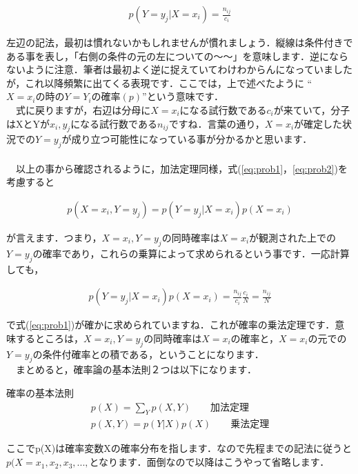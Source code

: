 \documentclass[11pt,a4paper]{ujreport} 	%
\begin{document}
\begin{align}
\label{eq:conditional}
p(Y=y_j | X=x_i) = \frac{n_{ij}}{c_i}
\end{align}

左辺の記法，最初は慣れないかもしれませんが慣れましょう．縦線は条件付きである事を表し，「右側の条件の元の左についての～～」を意味します．逆にならないように注意．筆者は最初よく逆に捉えていてわけわからんになっていましたが，これ以降頻繁に出てくる表現です．ここでは，上で述べたように ``$X=x_iの時のY=Y_iの確率(p)$''という意味です．\\
　式に戻りますが，右辺は分母に$X=x_i$になる試行数である$c_i$が来ていて，分子はXとYが$x_i, y_j$になる試行数である$n_{ij}$ですね．言葉の通り，$X=x_i$が確定した状況での$Y=y_j$が成り立つ可能性になっている事が分かるかと思います．\\
\\
　以上の事から確認されるように，加法定理同様，式(\ref{eq:prob1}，\ref{eq:prob2})を考慮すると

\begin{align}
p(X=x_i , Y=y_j) = p(Y=y_j | X=x_i)p(X=x_i)
\label{eq:product1}
\end{align}

が言えます．つまり，$X=x_i , Y=y_j$の同時確率は$X=x_i$が観測された上での$Y=y_j$の確率であり，これらの乗算によって求められるという事です．一応計算しても，

\begin{align}
p(Y=y_j | X=x_i)p(X=x_i) = \frac{n_{ij}}{c_i}\frac{c_i}{N} = \frac{n_{ij}}{N}
\label{eq:product2}
\end{align}

で式(\ref{eq:prob1})が確かに求められていますね．これが確率の乗法定理です．意味するところは，$X=x_i, Y=y_j$の同時確率は$X=x_i$の確率と，$X=x_i$の元での$Y=y_j$の条件付確率との積である，ということになります．
\\
　まとめると，確率論の基本法則２つは以下になります．

\begin{screen}
確率の基本法則
\begin{align}
p(X) = \sum_Y p(X,Y) \qquad \text{加法定理} \nonumber \\
p(X,Y) = p(Y|X)p(X) \qquad \text{乗法定理} \nonumber
\end{align}
\end{screen}

ここでp(X)は確率変数Xの確率分布を指します．なので先程までの記法に従うと$p(X=x_1, x_2, x_3, ..., $となります．面倒なので以降はこうやって省略します．
\end{document}
